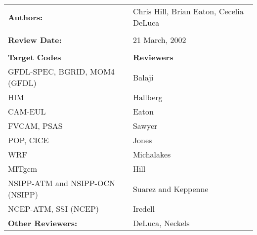 

\begin{tabular}{l l}

{\bf Authors:} & Chris Hill, Brian Eaton, Cecelia DeLuca \\ \\

{\bf Review Date:}            & 21 March, 2002 \\ \\

{\bf Target Codes }           & {\bf Reviewers} \\
GFDL-SPEC, BGRID, MOM4 (GFDL) & Balaji \\ 
HIM                           & Hallberg \\
CAM-EUL                       & Eaton \\
FVCAM, PSAS                   & Sawyer \\
POP, CICE                     & Jones \\
WRF                           & Michalakes \\
MITgcm                        & Hill \\
NSIPP-ATM and NSIPP-OCN (NSIPP) & Suarez and Keppenne \\
NCEP-ATM, SSI (NCEP)          & Iredell \\ 

{\bf Other Reviewers:}        & DeLuca, Neckels

\end{tabular}

